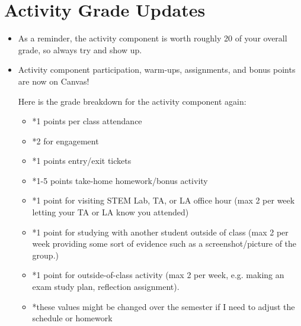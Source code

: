 \documentclass{article}
\begin{document}
\section*{Activity Grade Updates}
\begin{itemize}
    \item As a reminder, the activity component is worth roughly 20 of your overall grade, so always try and show up.
    
    \item Activity component participation, warm-ups, assignments, and bonus points are now on Canvas!
    
        Here is the grade breakdown for the activity component again:
        \begin{itemize}
            \item *1 points per class attendance
            
            \item *2 for engagement
            
            \item *1 points entry/exit tickets
            
            \item *1-5 points take-home homework/bonus activity
            
            \item *1 point for visiting STEM Lab, TA, or LA office 
                hour (max 2 per week letting your TA or LA know you attended)
        
            \item *1 point for studying with another student outside of class 
            (max 2 per week providing some sort of evidence such as a screenshot/picture of the group.)

            \item *1 point for outside-of-class activity 
            (max 2 per week, e.g. making an exam study plan, reflection assignment).

            \item *these values might be changed over the semester if I need to adjust the schedule or homework
        \end{itemize}

\end{itemize}
\end{document}

